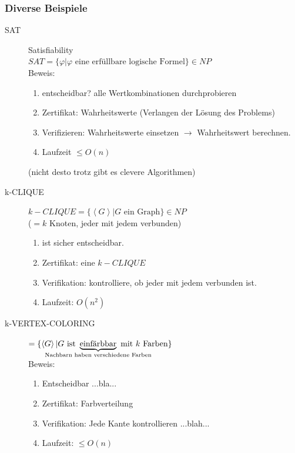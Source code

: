 \subsubsection{Diverse Beispiele}


\begin{description}
	\item[SAT] Satisfiability \\
		$SAT = \{\varphi | \varphi \text{ eine erfüllbare logische Formel}\} \in NP$ \\
		Beweis: \begin{enumerate}
			\item entscheidbar? alle Wertkombinationen durchprobieren
			\item Zertifikat: Wahrheitswerte (Verlangen der Lösung des Problems)
			\item Verifizieren: Wahrheitswerte einsetzen $\rightarrow$ Wahrheitswert berechnen.
			\item Laufzeit $\leq O(n)$
		\end{enumerate}
		(nicht desto trotz gibt es clevere Algorithmen)
	\item[k-CLIQUE] $k-CLIQUE = \{ \left< G \right> | G \text{ ein Graph} \} \in NP$ \\
		($=k$ Knoten, jeder mit jedem verbunden) \\
		\begin{enumerate}
			\item ist sicher entscheidbar.
			\item Zertifikat: eine $k-CLIQUE$
			\item Verifikation: kontrolliere, ob jeder mit jedem verbunden ist.
			\item Laufzeit: $O(n^2)$
		\end{enumerate}
	\item[k-VERTEX-COLORING] $= \{ \left< G \right> | G \text{ ist } \underbrace{\text{einfärbbar}}_{\mathclap{\text{Nachbarn haben verschiedene Farben}}} \text{ mit } k \text{ Farben} \}$ \\
	Beweis: \begin{enumerate}
		\item Entscheidbar ...bla...
		\item Zertifikat: Farbverteilung
		\item Verifikation: Jede Kante kontrollieren ...blah...
		\item Laufzeit: $\leq{O(n)}$
	\end{enumerate}
\end{description}

